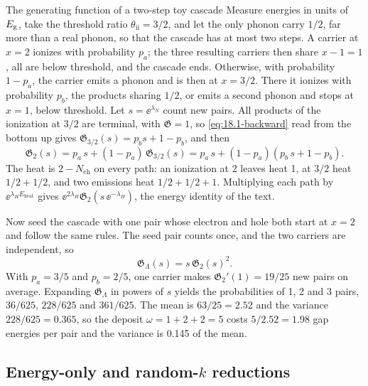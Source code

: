 \begin{workedexample}{The generating function of a two-step toy cascade}\label{we:18-toy}
Measure energies in units of $E_{\mathrm{g}}$, take the threshold ratio $\theta_{\mathrm{ii}} = 3/2$, and let the only phonon carry $1/2$, far more than a real phonon, so that the cascade has at most two steps. A carrier at $x = 2$ ionizes with probability $p_a$; the three resulting carriers then share $x - 1 = 1$, all are below threshold, and the cascade ends. Otherwise, with probability $1 - p_a$, the carrier emits a phonon and is then at $x = 3/2$. There it ionizes with probability $p_b$, the products sharing $1/2$, or emits a second phonon and stops at $x = 1$, below threshold. Let $s = \ee^{\lambda_N}$ count new pairs. All products of the ionization at $3/2$ are terminal, with $\mathfrak{G} = 1$, so \cref{eq:18.1-backward} read from the bottom up gives $\mathfrak{G}_{3/2}(s) = p_bs + 1 - p_b$, and then
\begin{equation*}
  \mathfrak{G}_2(s) = p_a\,s + (1 - p_a)\,\mathfrak{G}_{3/2}(s) = p_a\,s + (1 - p_a)(p_b\,s + 1 - p_b) .
\end{equation*}
The heat is $2 - N_{\mathrm{eh}}$ on every path: an ionization at 2 leaves heat 1, at $3/2$ heat $1/2 + 1/2$, and two emissions heat $1/2 + 1/2 + 1$. Multiplying each path by $\ee^{\lambda_H E_{\mathrm{heat}}}$ gives $\ee^{2\lambda_H}\mathfrak{G}_2(s\,\ee^{-\lambda_H})$, the energy identity of the text.

Now seed the cascade with one pair whose electron and hole both start at $x = 2$ and follow the same rules. The seed pair counts once, and the two carriers are independent, so
\begin{equation*}
  \mathfrak{G}_\Lambda(s) = s\,\mathfrak{G}_2(s)^2 .
\end{equation*}
With $p_a = 3/5$ and $p_b = 2/5$, one carrier makes $\mathfrak{G}_2'(1) = 19/25$ new pairs on average. Expanding $\mathfrak{G}_\Lambda$ in powers of $s$ yields the probabilities of 1, 2 and 3 pairs, $36/625$, $228/625$ and $361/625$. The mean is $63/25 = 2.52$ and the variance $228/625 = 0.365$, so the deposit $\omega = 1 + 2 + 2 = 5$ costs $5/2.52 = 1.98$ gap energies per pair and the variance is 0.145 of the mean.
\end{workedexample}

\subsection{Energy-only and random-$k$ reductions}\label{sec:18.1-reductions}

